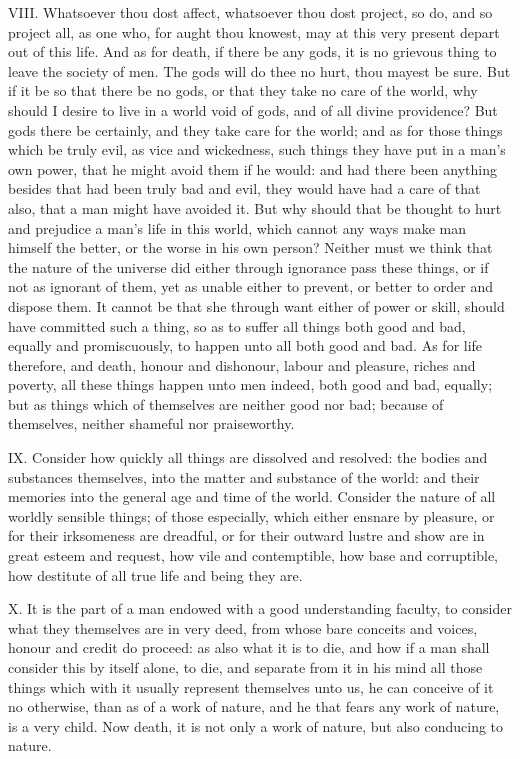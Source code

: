 VIII. Whatsoever thou dost affect, whatsoever thou dost project, so do,
and so project all, as one who, for aught thou knowest, may at this very
present depart out of this life. And as for death, if there be any gods,
it is no grievous thing to leave the society of men. The gods will do thee
no hurt, thou mayest be sure. But if it be so that there be no gods, or
that they take no care of the world, why should I desire to live in a
world void of gods, and of all divine providence? But gods there be
certainly, and they take care for the world; and as for those things which
be truly evil, as vice and wickedness, such things they have put in a
man's own power, that he might avoid them if he would: and had there been
anything besides that had been truly bad and evil, they would have had a
care of that also, that a man might have avoided it. But why should that
be thought to hurt and prejudice a man's life in this world, which cannot
any ways make man himself the better, or the worse in his own person?
Neither must we think that the nature of the universe did either through
ignorance pass these things, or if not as ignorant of them, yet as unable
either to prevent, or better to order and dispose them. It cannot be that
she through want either of power or skill, should have committed such a
thing, so as to suffer all things both good and bad, equally and
promiscuously, to happen unto all both good and bad. As for life
therefore, and death, honour and dishonour, labour and pleasure, riches
and poverty, all these things happen unto men indeed, both good and bad,
equally; but as things which of themselves are neither good nor bad;
because of themselves, neither shameful nor praiseworthy.

IX. Consider how quickly all things are dissolved and resolved: the
bodies and substances themselves, into the matter and substance of the
world: and their memories into the general age and time of the world.
Consider the nature of all worldly sensible things; of those especially,
which either ensnare by pleasure, or for their irksomeness are dreadful,
or for their outward lustre and show are in great esteem and request, how
vile and contemptible, how base and corruptible, how destitute of all true
life and being they are.

X. It is the part of a man endowed with a good understanding faculty, to
consider what they themselves are in very deed, from whose bare conceits
and voices, honour and credit do proceed: as also what it is to die, and
how if a man shall consider this by itself alone, to die, and separate
from it in his mind all those things which with it usually represent
themselves unto us, he can conceive of it no otherwise, than as of a work
of nature, and he that fears any work of nature, is a very child. Now
death, it is not only a work of nature, but also conducing to nature.

